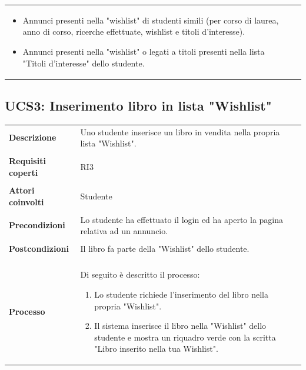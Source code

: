 \documentclass[10pt,a4paper]{report}
\begin{document}
\begin{tabular}{lp{}}
\begin{enumerate}
\begin{itemize}
\begin{itemize}
					\begin{itemize}
						\item Annunci presenti nella "wishlist" di studenti simili (per corso di laurea, anno di corso, ricerche effettuate, wishlist e titoli d'interesse).
						\item Annunci presenti nella "wishlist" o legati a titoli presenti nella lista "Titoli d'interesse" dello studente.
					\end{itemize}
				\end{itemize}
			\end{itemize} 
		\end{enumerate}
	\end{tabular}

	\subsection{UCS3: Inserimento libro in lista "Wishlist"}
	\begin{tabular}{lp{}}
		\textbf{Descrizione}&Uno studente inserisce un libro in vendita nella propria lista "Wishlist".\\
		\\
		\textbf{Requisiti coperti}&RI3\\
		\\
		\textbf{Attori coinvolti}&Studente\\
		\\
		\textbf{Precondizioni}&Lo studente ha effettuato il login ed ha aperto la pagina relativa ad un annuncio.\\
		\\
		\textbf{Postcondizioni}&Il libro fa parte della "Wishlist" dello studente.\\
		\\
		\textbf{Processo}&Di seguito è descritto il processo:
		\begin{enumerate}
			\item Lo studente richiede l'inserimento del libro nella propria "Wishlist".
			\item Il sistema inserisce il libro nella "Wishlist" dello studente e mostra un riquadro verde con la scritta "Libro inserito nella tua Wishlist".
		\end{enumerate}
	\end{tabular}
\end{document}
